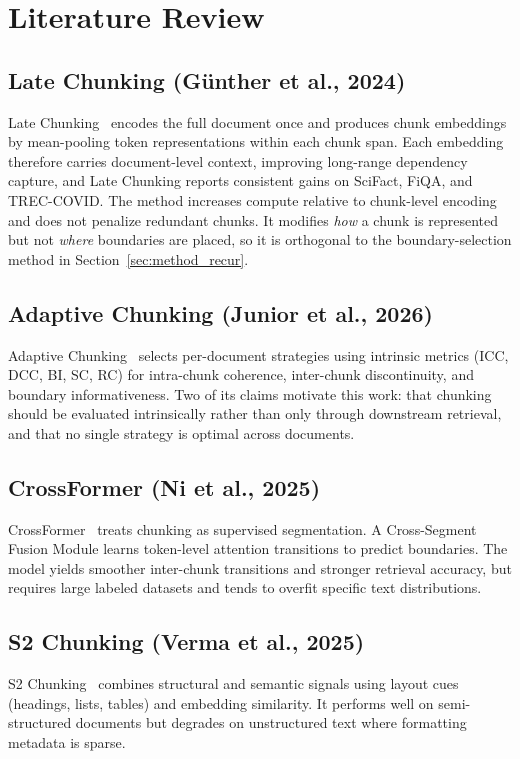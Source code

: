 \section{Literature Review}
\subsection{Late Chunking (G{\"u}nther et al., 2024)}
Late Chunking~\cite{gunther2024late} encodes the full document once and produces chunk embeddings by mean-pooling token representations within each chunk span. Each embedding therefore carries document-level context, improving long-range dependency capture, and Late Chunking reports consistent gains on SciFact, FiQA, and TREC-COVID. The method increases compute relative to chunk-level encoding and does not penalize redundant chunks. It modifies \emph{how} a chunk is represented but not \emph{where} boundaries are placed, so it is orthogonal to the boundary-selection method in Section~\ref{sec:method_recur}.

\subsection{Adaptive Chunking (Junior et al., 2026)}
Adaptive Chunking~\cite{junior2026adaptivechunkingoptimizingchunkingmethod} selects per-document strategies using intrinsic metrics (ICC, DCC, BI, SC, RC) for intra-chunk coherence, inter-chunk discontinuity, and boundary informativeness. Two of its claims motivate this work: that chunking should be evaluated intrinsically rather than only through downstream retrieval, and that no single strategy is optimal across documents.

\subsection{CrossFormer (Ni et al., 2025)}
CrossFormer~\cite{ni2025crossformer} treats chunking as supervised segmentation. A Cross-Segment Fusion Module learns token-level attention transitions to predict boundaries. The model yields smoother inter-chunk transitions and stronger retrieval accuracy, but requires large labeled datasets and tends to overfit specific text distributions.

\subsection{S2 Chunking (Verma et al., 2025)}
S2 Chunking~\cite{verma2025s2chunking} combines structural and semantic signals using layout cues (headings, lists, tables) and embedding similarity. It performs well on semi-structured documents but degrades on unstructured text where formatting metadata is sparse.

